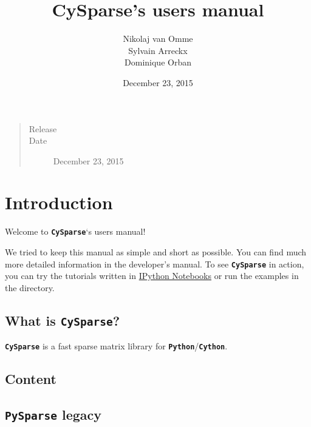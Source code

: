 \documentclass[letterpaper,10pt,english]{sphinxmanual}
\title{CySparse's users manual}
\date{December 23, 2015}
\author{Nikolaj van Omme\\Sylvain Arreckx\\Dominique Orban}
\begin{document}
\maketitle
\tableofcontents
{}\label{contents::doc}

\begin{quote}\begin{description}
\item[{Release}] 

\item[{Date}] \leavevmode
December 23, 2015

\end{description}\end{quote}


\chapter{Introduction}
\label{introduction:introduction}\label{introduction:cysparse-s-users-manual}\label{introduction::doc}
Welcome to \textbf{\texttt{CySparse}}`s users manual!

We tried to keep this manual as simple and short as possible. You can find much more detailed information in the developer's manual.
To see \textbf{\texttt{CySparse}} in action, you can try the tutorials written in \href{http://ipython.org/notebook.html}{IPython Notebooks} or run the examples in the
 directory.


\section{What is \textbf{\texttt{CySparse}}?}
\label{introduction:what-is-cysparse}
\textbf{\texttt{CySparse}} is a fast sparse matrix library for \textbf{\texttt{Python}}/\textbf{\texttt{Cython}}.


\section{Content}
\label{introduction:content}

\section{\textbf{\texttt{PySparse}} legacy}
\label{introduction:pysparse-legacy}
\end{document}

